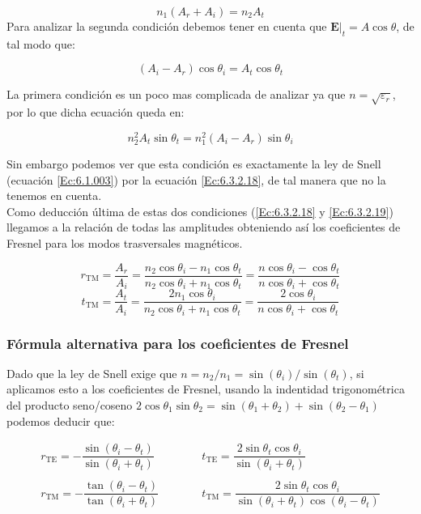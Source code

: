 \documentclass[12pt,a4paper]{article}
\newcommand{\tquad}{\quad \quad \quad}
\newcommand{\En}{\mathbf{E}}
\numberwithin{equation}{section}
\numberwithin{figure}{section}
\begin{document}
\begin{equation}
n_1 (A_r + A_i) = n_2 A_t \label{Ec:6.3.2.18}
\end{equation}
Para analizar la segunda condición debemos tener en cuenta que $\En |_t = A \cos \theta $, de tal modo que:

\begin{equation} 
(A_i-A_r) \cos \theta_i = A_t \cos \theta_t  \label{Ec:6.3.2.19}
\end{equation}

La primera condición es un poco mas complicada de analizar ya que $n=\sqrt{\varepsilon_r}$, por lo que dicha ecuación queda en:

$$ n^2_2 A_t \sin \theta_t = n_1^2 (A_i-A_r) \sin \theta_i $$

Sin embargo podemos ver que esta condición es exactamente la ley de Snell (ecuación \ref{Ec:6.1.003}) por la ecuación \ref{Ec:6.3.2.18}, de tal manera que no la tenemos en cuenta. \\


Como deducción última de estas dos condiciones (\ref{Ec:6.3.2.18} y \ref{Ec:6.3.2.19}) llegamos a la relación de todas las amplitudes obteniendo así los coeficientes de Fresnel para los modos trasversales magnéticos.

\begin{equation}
r_{\mathrm{TM}} = \dfrac{A_r}{A_i} = \dfrac{n_2 \cos \theta_i - n_1 \cos \theta_t}{n_2 \cos \theta_i + n_1 \cos \theta_t} = \dfrac{ n \cos \theta_i - \cos \theta_t}{n \cos \theta_i + \cos \theta_t}
\end{equation}
\begin{equation}
t_{\mathrm{TM}} = \dfrac{A_t}{A_i} = \dfrac{ 2 n_1 \cos \theta_i }{n_2 \cos \theta_i + n_1 \cos \theta_t} = \dfrac{2 \cos \theta_i}{ n \cos \theta_i + \cos \theta_t}
\end{equation}

\subsubsection{Fórmula alternativa para los coeficientes de Fresnel}

Dado que la ley de Snell exige que $n=n_2/n_1 = \sin (\theta_i) / \sin (\theta_t)$, si aplicamos esto a los coeficientes de Fresnel, usando la indentidad trigonométrica del producto seno/coseno $2 \cos \theta_1 \sin \theta_2 = \sin(\theta_1+\theta_2) + \sin (\theta_2 - \theta_1)$ podemos deducir que:

\begin{equation}
\begin{array}{ll}
r_{\mathrm{TE}} = - \dfrac{\sin(\theta_i-\theta_t)}{\sin (\theta_i + \theta_t)}
\tquad &
t_{\mathrm{TE}} =  \dfrac{2 \sin \theta_t \cos \theta_i}{ \sin ( \theta_i +  \theta_t)}
\\ \\
r_{\mathrm{TM}} = - \dfrac{\tan(\theta_i-\theta_t)}{\tan (\theta_i+ \theta_t)}
\tquad &
t_{\mathrm{TM}} =  \dfrac{2 \sin \theta_t \cos \theta_i}{ \sin ( \theta_i +  \theta_t) \cos( \theta_i - \theta_t)}
\end{array}
\end{equation}
\end{document}
